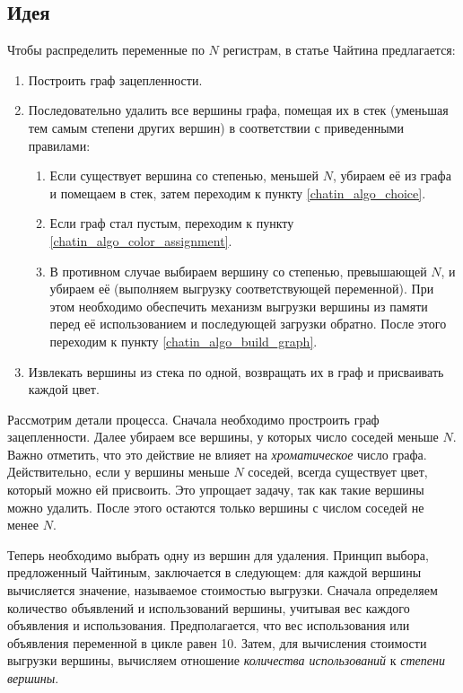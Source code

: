\subsection{Идея}

Чтобы распределить переменные по $N$ регистрам, в статье Чайтина предлагается:

\begin{enumerate}
    \item Построить граф зацепленности. \label{chatin_algo_build_graph}
    \item Последовательно удалить все вершины графа, помещая их в стек (уменьшая тем самым степени других вершин) в соответствии с приведенными правилами: \label{chatin_algo_choice}
    \begin{enumerate}
        \item Если существует вершина со степенью, меньшей $N$, убираем её из графа и помещаем в стек, затем переходим к пункту \ref{chatin_algo_choice}.
        \item Если граф стал пустым, переходим к пункту \ref{chatin_algo_color_assignment}.
        \item В противном случае выбираем вершину со степенью, превышающей $N$, и убираем её (выполняем выгрузку соответствующей переменной). 
        При этом необходимо обеспечить механизм выгрузки вершины из памяти перед её использованием и последующей загрузки обратно. 
        После этого переходим к пункту \ref{chatin_algo_build_graph}. \label{chatin_algo_spill}
    \end{enumerate}
    \item Извлекать вершины из стека по одной, возвращать их в граф и присваивать каждой цвет. \label{chatin_algo_color_assignment}
\end{enumerate}

Рассмотрим детали процесса.
Сначала необходимо простроить граф зацепленности.
Далее убираем все вершины, у которых число соседей меньше $N$. 
Важно отметить, что это действие не влияет на \textit{хроматическое} число графа. 
Действительно, если у вершины меньше $N$ соседей, всегда существует цвет, который можно ей присвоить. 
Это упрощает задачу, так как такие вершины можно удалить. 
После этого остаются только вершины с числом соседей не менее $N$.

Теперь необходимо выбрать одну из вершин для удаления.
Принцип выбора, предложенный Чайтиным, заключается в следующем: для каждой вершины вычисляется значение, называемое стоимостью выгрузки. 
Сначала определяем количество объявлений и использований вершины, учитывая вес каждого объявления и использования. 
Предполагается, что вес использования или объявления переменной в цикле равен 10. 
Затем, для вычисления стоимости выгрузки вершины, вычисляем отношение 
\textit{количества использований} к \textit{степени вершины}.

